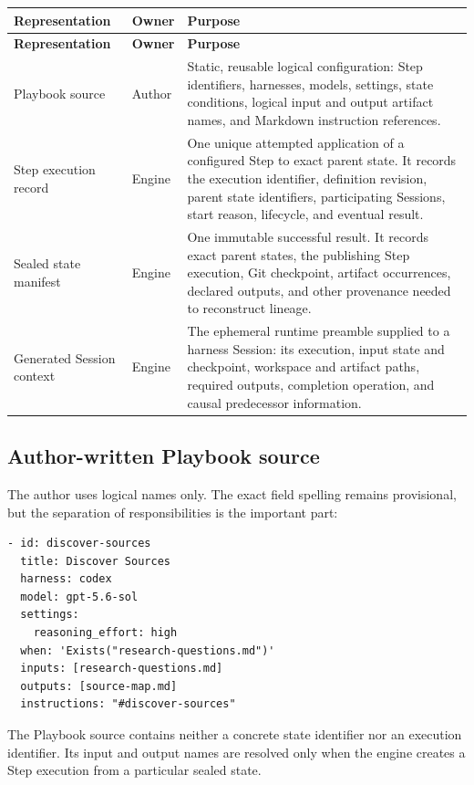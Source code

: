 \documentclass[11pt]{article}
\begin{document}
\begin{longtable}{@{}L{1.34in}L{0.82in}L{4.38in}@{}}
\toprule
\textbf{Representation} & \textbf{Owner} & \textbf{Purpose} \\
\midrule
\endfirsthead
\toprule
\textbf{Representation} & \textbf{Owner} & \textbf{Purpose} \\
\midrule
\endhead
Playbook source & Author & Static, reusable logical configuration: Step identifiers, harnesses, models, settings, state conditions, logical input and output artifact names, and Markdown instruction references. \\
Step execution record & Engine & One unique attempted application of a configured Step to exact parent state. It records the execution identifier, definition revision, parent state identifiers, participating Sessions, start reason, lifecycle, and eventual result. \\
Sealed state manifest & Engine & One immutable successful result. It records exact parent states, the publishing Step execution, Git checkpoint, artifact occurrences, declared outputs, and other provenance needed to reconstruct lineage. \\
Generated Session context & Engine & The ephemeral runtime preamble supplied to a harness Session: its execution, input state and checkpoint, workspace and artifact paths, required outputs, completion operation, and causal predecessor information. \\
\bottomrule
\end{longtable}

\subsection{Author-written Playbook source}

The author uses logical names only. The exact field spelling remains
provisional, but the separation of responsibilities is the important part:

\begin{lstlisting}[style=playbook]
- id: discover-sources
  title: Discover Sources
  harness: codex
  model: gpt-5.6-sol
  settings:
    reasoning_effort: high
  when: 'Exists("research-questions.md")'
  inputs: [research-questions.md]
  outputs: [source-map.md]
  instructions: "#discover-sources"
\end{lstlisting}

The Playbook source contains neither a concrete state identifier nor an
execution identifier. Its input and output names are resolved only when the
engine creates a Step execution from a particular sealed state.
\end{document}
